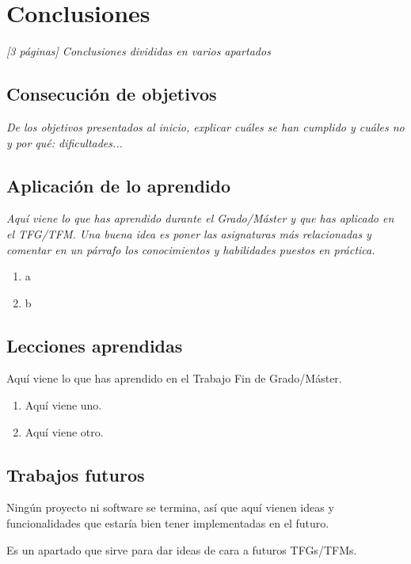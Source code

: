 \chapter{Conclusiones}
\label{chap:conclusiones}

\textit{[3 páginas] Conclusiones divididas en varios apartados}


\section{Consecución de objetivos}
\label{sec:consecucion-objetivos}

\textit{De los objetivos presentados al inicio, explicar cuáles se han cumplido y cuáles no y por qué: dificultades...}

\section{Aplicación de lo aprendido}
\label{sec:aplicacion}

\textit{Aquí viene lo que has aprendido durante el Grado/Máster y que has aplicado en el TFG/TFM. Una buena idea es poner las asignaturas más relacionadas y comentar en un párrafo los conocimientos y habilidades puestos en práctica.}

\begin{enumerate}
  \item a
  \item b
\end{enumerate}


\section{Lecciones aprendidas}
\label{sec:lecciones-aprendidas}

Aquí viene lo que has aprendido en el Trabajo Fin de Grado/Máster.

\begin{enumerate}
  \item Aquí viene uno.
  \item Aquí viene otro.
\end{enumerate}


\section{Trabajos futuros}
\label{sec:trabajos-futuros}

Ningún proyecto ni software se termina, así que aquí vienen ideas y funcionalidades que estaría bien tener implementadas en el futuro.

Es un apartado que sirve para dar ideas de cara a futuros TFGs/TFMs.